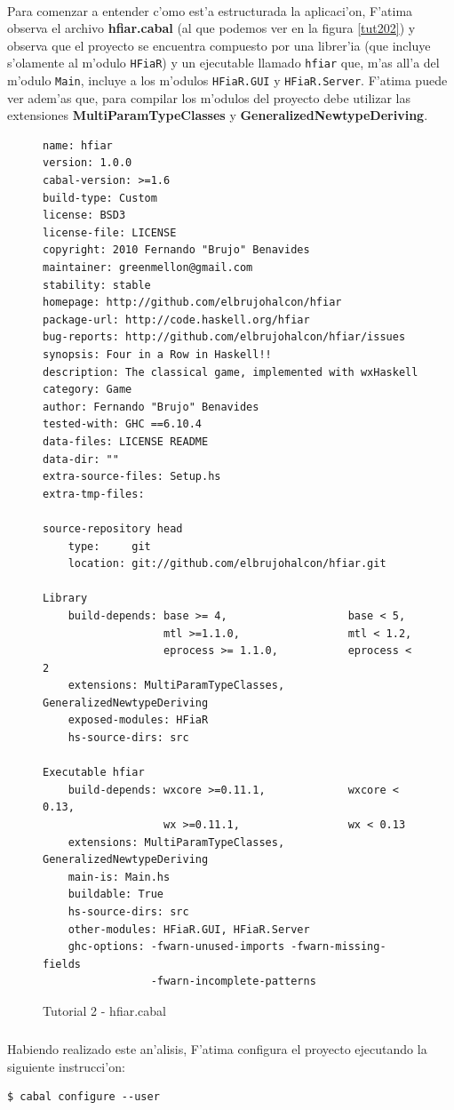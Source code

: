 \documentclass[a4paper]{article}
\begin{document}
\paragraph{}Para comenzar a entender c'omo est'a estructurada la aplicaci'on, F'atima observa el archivo \textbf{hfiar.cabal} (al que podemos ver en la figura \ref{tut202}) y observa que el proyecto se encuentra compuesto por una librer'ia (que incluye s'olamente al m'odulo \texttt{HFiaR}) y un ejecutable llamado \texttt{hfiar} que, m'as all'a del m'odulo \texttt{Main}, incluye a los m'odulos \texttt{HFiaR.GUI} y \texttt{HFiaR.Server}.  F'atima puede ver adem'as que, para compilar los m'odulos del proyecto debe utilizar las extensiones \textbf{MultiParamTypeClasses} y \textbf{GeneralizedNewtypeDeriving}.
\begin{figure}[hp]
	\begin{center}
	\hbox{}
		\begin{lstlisting}
name: hfiar
version: 1.0.0
cabal-version: >=1.6
build-type: Custom
license: BSD3
license-file: LICENSE
copyright: 2010 Fernando "Brujo" Benavides
maintainer: greenmellon@gmail.com
stability: stable
homepage: http://github.com/elbrujohalcon/hfiar
package-url: http://code.haskell.org/hfiar
bug-reports: http://github.com/elbrujohalcon/hfiar/issues
synopsis: Four in a Row in Haskell!!
description: The classical game, implemented with wxHaskell
category: Game
author: Fernando "Brujo" Benavides
tested-with: GHC ==6.10.4
data-files: LICENSE README
data-dir: ""
extra-source-files: Setup.hs
extra-tmp-files:

source-repository head
    type:     git
    location: git://github.com/elbrujohalcon/hfiar.git

Library
    build-depends: base >= 4,                   base < 5,
                   mtl >=1.1.0,                 mtl < 1.2,
                   eprocess >= 1.1.0,           eprocess < 2
    extensions: MultiParamTypeClasses, GeneralizedNewtypeDeriving
    exposed-modules: HFiaR
    hs-source-dirs: src

Executable hfiar
    build-depends: wxcore >=0.11.1,             wxcore < 0.13,
                   wx >=0.11.1,                 wx < 0.13
    extensions: MultiParamTypeClasses, GeneralizedNewtypeDeriving
    main-is: Main.hs
    buildable: True
    hs-source-dirs: src
    other-modules: HFiaR.GUI, HFiaR.Server
    ghc-options: -fwarn-unused-imports -fwarn-missing-fields
                 -fwarn-incomplete-patterns
		\end{lstlisting}
		\caption{Tutorial 2 - hfiar.cabal}
		\label{tut201}
	\end{center}
\end{figure}
\subparagraph{}Habiendo realizado este an'alisis, F'atima configura el proyecto ejecutando la siguiente instrucci'on:
\begin{lstlisting}
$ cabal configure --user
\end{lstlisting}
\end{document}
